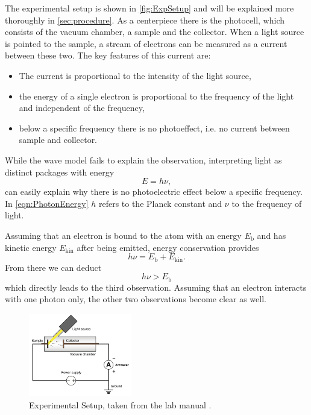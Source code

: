The experimental setup is shown in \autoref{fig:ExpSetup} and will be explained more thoroughly in
\autoref{sec:procedure}. As a centerpiece there is the photocell, which consists of the vacuum
chamber, a sample and the collector. When a light source is pointed to the sample, a stream of
electrons can be measured as a current between these two. The key features of this current are:
\begin{itemize}
  \item The current is proportional to the intensity of the light source,
  \item the energy of a single electron is proportional to the frequency of the light and
    independent of the frequency,
  \item below a specific frequency there is no photoeffect, i.e. no current between sample and
    collector.
\end{itemize}
While the wave model fails to explain the  observation, interpreting light as distinct
packages with energy
\begin{equation}
  E = h\nu,
  \label{eqn:PhotonEnergy}
\end{equation}
can easily explain why there is no photoelectric effect below a specific frequency.
In \autoref{eqn:PhotonEnergy} $h$ refers to the Planck constant and $\nu$ to the frequency of
light.

Assuming that an electron is bound to the atom with an energy $E_\text{b}$ and has kinetic energy
$E_\text{kin}$ after being emitted, energy conservation provides
\begin{equation}
    h\nu = E_\text{b} + E_\text{kin}.
    \label{eqn:EnergyConservation}
\end{equation}
From there we can deduct 
\[
  h\nu > E_\text{b}
\]
which directly leads to the third observation. Assuming that an electron interacts with one photon
only, the other two observations become clear as well.

\begin{figure}
    \centering
    \includegraphics[width=0.4\textwidth]{media/ExperimentalSetup.png}
    \caption{Experimental Setup, taken from the lab manual \cite{LabInstructions}.}
    \label{fig:ExpSetup}
\end{figure}


